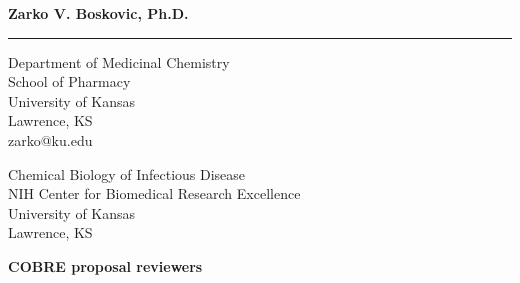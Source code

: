 \documentclass{letter}
\begin{document}
\begin{letter}{}

\begin{minipage}{\textwidth}
    \vspace{-1cm}
    \begin{flushleft}
    {\large\bf Zarko V. Boskovic, Ph.D.}
    \end{flushleft}
    \medskip\hrule height 1pt
    \begin{flushright}
    \hfill Department of Medicinal Chemistry \\
    \hfill School of Pharmacy\\
    \hfill University of Kansas\\
    \hfill Lawrence, KS\\
    \hfill zarko@ku.edu\\
    \end{flushright}
\end{minipage}

{Chemical Biology of Infectious Disease\\
NIH Center for Biomedical Research Excellence\\
University of Kansas\\
Lawrence, KS}
\begin{center}
\textbf{COBRE proposal reviewers}\\
\end{center}
\opening{}


\end{letter}
\end{document}
